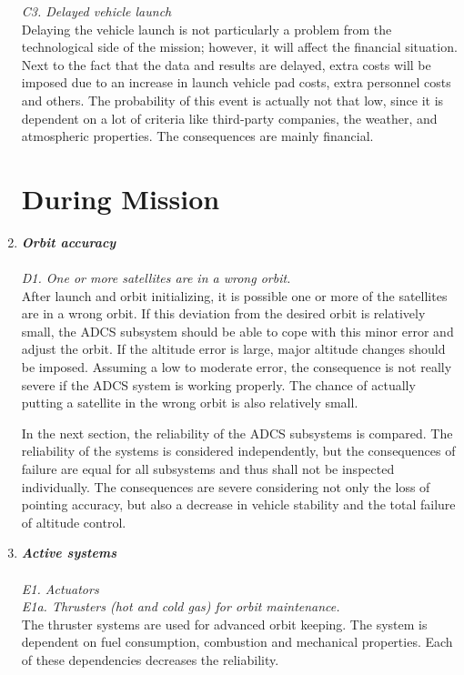 \begin{enumerate}[A]
\textit{C3. Delayed vehicle launch}\\
Delaying the vehicle launch is not particularly a problem from the technological side of the mission; however, it will affect the financial situation. Next to the fact that the data and results are delayed, extra costs will be imposed due to an increase in launch vehicle pad costs, extra personnel costs and others. The probability of this event is actually not that low, since it is dependent on a lot of criteria like third-party companies, the weather, and atmospheric properties. The consequences are mainly financial.

\section{During Mission}
\label{blTRADm}
	\item  \textbf{\textit{Orbit accuracy }} \\\\
\textit{D1. One or more satellites are in a wrong orbit.}\\
After launch and orbit initializing, it is possible one or more of the satellites are in a wrong orbit. If this deviation from the desired orbit is relatively small, the ADCS subsystem should be able to cope with this minor error and adjust the orbit. If the altitude error is large, major altitude changes should be imposed. Assuming a low to moderate error, the consequence is not really severe if the ADCS system is working properly. The chance of actually putting a satellite in the wrong orbit is also relatively small.

In the next section, the reliability of the ADCS subsystems is compared. The reliability of the systems is considered independently, but the consequences of failure are equal for all subsystems and thus shall not be inspected individually. The consequences are severe considering not only the loss of pointing accuracy, but also a decrease in vehicle stability and the total failure of altitude control.  	

	\item  \textbf{\textit{Active systems}} \\\\
\textit{E1. Actuators}\\

\textit{E1a. Thrusters (hot and cold gas) for orbit maintenance.}\\ 
The thruster systems are used for advanced orbit keeping. The system is dependent on fuel consumption, combustion and mechanical properties. Each of these dependencies decreases the reliability. 


\end{enumerate}
